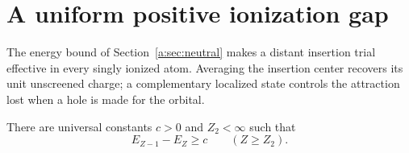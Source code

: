 \section{A uniform positive ionization gap}\label{a:sec:gap}

The energy bound of Section~\ref{a:sec:neutral} makes a distant insertion
trial effective in every singly ionized atom.  Averaging the insertion
center recovers its unit unscreened charge; a complementary localized
state controls the attraction lost when a hole is made for the orbital.

\begin{proposition}\label{a:prop:tail-gap}
There are universal constants $c>0$ and $Z_2<\infty$ such that
\begin{equation}\label{a:eq:tail-gap}
 E_{Z-1}-E_Z\ge c\qquad(Z\ge Z_2).
\end{equation}
\end{proposition}

